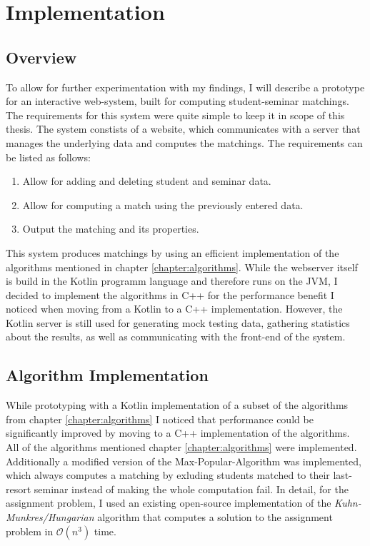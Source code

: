 \section{Implementation}

\subsection{Overview}
To allow for further experimentation with my findings, I will describe a prototype for an interactive web-system, built for computing student-seminar matchings. The requirements for this system were quite simple to keep it in scope of this thesis. The system constists of a website, which communicates with a server that manages the underlying data and computes the matchings. The requirements can be listed as follows:
\begin{enumerate}
    \item Allow for adding and deleting student and seminar data.
    \item Allow for computing a match using the previously entered data.
    \item Output the matching and its properties.
\end{enumerate}
This system produces matchings by using an efficient implementation of the algorithms mentioned in chapter \ref{chapter:algorithms}. While the webserver itself is build in the Kotlin programm language and therefore runs on the JVM, I decided to implement the algorithms in C++ for the performance benefit I noticed when moving from a Kotlin to a C++ implementation. However, the Kotlin server is still used for generating mock testing data, gathering statistics about the results, as well as communicating with the front-end of the system.

\subsection{Algorithm Implementation}
While prototyping with a Kotlin implementation of a subset of the algorithms from chapter \ref{chapter:algorithms} I noticed that performance could be significantly improved by moving to a C++ implementation of the algorithms. All of the algorithms mentioned chapter \ref{chapter:algorithms} were implemented. Additionally a modified version of the Max-Popular-Algorithm was implemented, which always computes a matching by exluding students matched to their last-resort seminar instead of making the whole computation fail. In detail, for the assignment problem, I used an existing open-source implementation of the \textit{Kuhn-Munkres/Hungarian} algorithm that computes a solution to the assignment problem in $\mathcal{O}(n^3)$ time\cite{HungarianGithub}.

